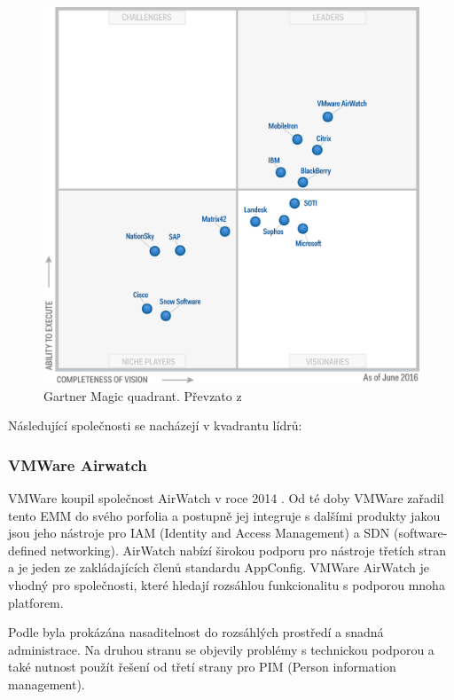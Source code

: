  \begin{figure}[h]
\includegraphics[width=13cm]{img/Gartner_EMM}
\caption{Gartner Magic quadrant. Převzato z \cite{Gartner_EMM_2016}} 
\label{EMM:quadrant}
\centering
\end{figure}
 
Následující společnosti se nacházejí v kvadrantu lídrů:


\subsubsection{VMWare Airwatch}
VMWare koupil společnost AirWatch v roce 2014 . Od té doby VMWare zařadil tento EMM do svého porfolia a postupně jej integruje s dalšími produkty jakou jsou jeho nástroje pro IAM (Identity and Access Management) a SDN (software-defined networking). AirWatch nabízí širokou podporu pro nástroje třetích stran a je jeden ze zakládajících členů standardu AppConfig. VMWare AirWatch je vhodný pro společnosti, které hledají rozsáhlou funkcionalitu s podporou mnoha platforem.

Podle  byla prokázána nasaditelnost do rozsáhlých prostředí a snadná administrace. Na druhou stranu se objevily problémy s technickou podporou a také nutnost použít řešení od třetí strany pro PIM (Person information management).



